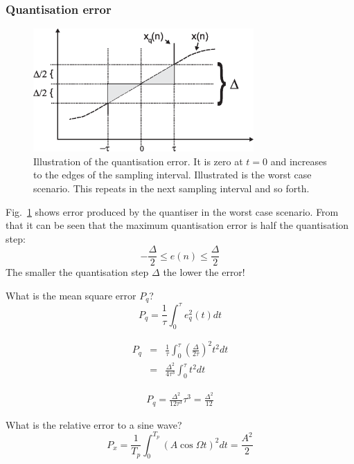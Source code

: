 \documentclass[12pt,a4paper]{article}
\begin{document}
\subsubsection{Quantisation error}
\begin{figure}[!hbt]
\begin{center}
\mbox{\includegraphics[width=0.75\textwidth]{quant_err}}
\end{center}
\caption{Illustration of the quantisation error. It is zero at $t=0$
and increases to the edges of the sampling interval. Illustrated
is the worst case scenario. This repeats in the next sampling interval
and so forth.
\label{quant_err}}
\end{figure}

Fig.~\ref{quant_err} shows error produced by the quantiser in the
worst case scenario. From that it can be seen that the maximum quantisation
error is half the quantisation step:
\begin{equation}
- \frac{\Delta}{2} \le e(n) \le \frac{\Delta}{2}
\end{equation}
The smaller the quantisation step $\Delta$ the lower the error!

What is the mean square error $P_{q}$?
\begin{equation}
P_{q} = \frac {1}{\tau} \int_{0}^{\tau} e_{q}^{2}(t)  dt
\end{equation}

\begin{eqnarray}
P_{q} & = & \frac{1}{\tau} \int_0^\tau \left(\frac{\Delta}{2\tau}\right)^2 t^2 dt \\
      & = & \frac{\Delta^2}{4 \tau^3} \int_0^\tau t^2 dt
\end{eqnarray}

\begin{eqnarray}
P_{q} = \frac{\Delta^2}{12\tau^3} \tau^3 =\frac{\Delta^2}{12}
\end{eqnarray}


What is the relative error to a sine wave?
\begin{equation}
P_x = \frac{1}{T_p} \int_{0}^{T_p}(A \cos \Omega t)^2 dt = \frac{A^2}{2}
\end{equation}
\end{document}
